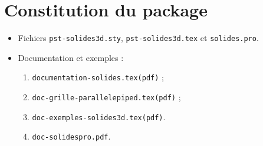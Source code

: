 \section {Constitution du package}

\begin{itemize}
\item Fichiers \texttt{pst-solides3d.sty}, \texttt{pst-solides3d.tex} et
\texttt{solides.pro}.
\item Documentation et exemples :
\begin{enumerate}
  \item \texttt{documentation-solides.tex(pdf)} ;
  \item \texttt{doc-grille-parallelepiped.tex(pdf)} ;
  \item \texttt{doc-exemples-solides3d.tex(pdf)}.
  \item \texttt{doc-solidespro.pdf}.
\end{enumerate}
\end{itemize}
